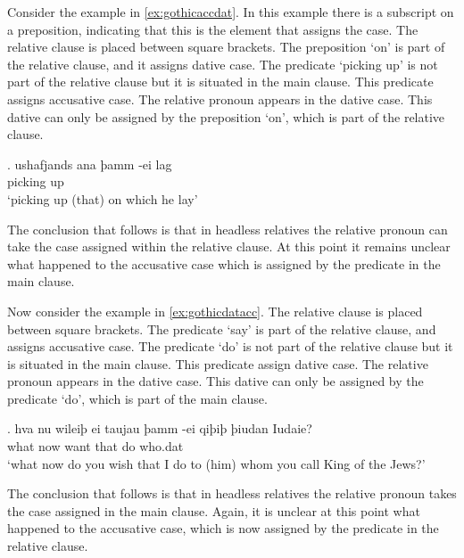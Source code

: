 Consider the example in \ref{ex:gothicaccdat}. In this example there is a subscript on a preposition, indicating that this is the element that assigns the case. The relative clause is placed between square brackets. The preposition  `on' is part of the relative clause, and it assigns dative case. The predicate  `picking up' is not part of the relative clause but it is situated in the main clause. This predicate assigns accusative case. The relative pronoun  appears in the dative case. This dative can only be assigned by the preposition  `on', which is part of the relative clause.

\exg. ushafjands ana þamm -ei lag\\
 {picking up}\scsub{[acc]}    \\
 `picking up (that) on which he lay' \label{ex:gothicaccdat}

The conclusion that follows is that in headless relatives the relative pronoun can take the case assigned within the relative clause. At this point it remains unclear what happened to the accusative case which is assigned by the predicate in the main clause.

Now consider the example in \ref{ex:gothicdatacc}. The relative clause is placed between square brackets. The predicate  `say' is part of the relative clause, and assigns accusative case. The predicate  `do' is not part of the relative clause but it is situated in the main clause. This predicate assign dative case. The relative pronoun  appears in the dative case. This dative can only be assigned by the predicate  `do', which is part of the main clause.

\exg. hva nu wileiþ ei taujau þamm -ei qiþiþ þiudan Iudaie?\\
 what now want that do\scsub{[dat]} who.\ac{dat}    \\
 `what now do you wish that I do to (him) whom you call King of the Jews?' \label{ex:gothicdatacc}

The conclusion that follows is that in headless relatives the relative pronoun takes the case assigned in the main clause. Again, it is unclear at this point what happened to the accusative case, which is now assigned by the predicate in the relative clause.

